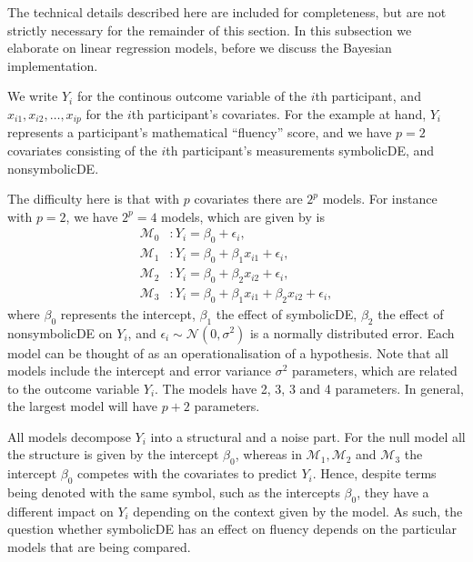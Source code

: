 \documentclass[english,,doc,floatsintext]{apa6}
\begin{document}
The technical details described here are included for completeness, but are not strictly necessary for the remainder of this section. In this subsection we elaborate on linear regression models, before we discuss the Bayesian implementation.

We write \(Y_{i}\) for the continous outcome variable of the \(i\)th participant, and \(x_{i1}, x_{i2}, \ldots, x_{ip}\) for the \(i\)th participant's covariates. For the example at hand, \(Y_{i}\) represents a participant's mathematical \enquote{fluency} score, and we have \(p=2\) covariates consisting of the \(i\)th participant's measurements symbolicDE, and nonsymbolicDE.

The difficulty here is that with \(p\) covariates there are \(2^{p}\) models. For instance with \(p=2\), we have \(2^{p} = 4\) models, which are given by is
\begin{align}
\mathcal{M}_{0} & : Y_{i} =\beta_{0} + \epsilon_{i}, \\
\mathcal{M}_{1} & : Y_{i} =\beta_{0} + \beta_{1} x_{i1} + \epsilon_{i}, \\
\mathcal{M}_{2} & : Y_{i} =\beta_{0} + \beta_{2} x_{i2} + \epsilon_{i}, \\
\mathcal{M}_{3} & : Y_{i} =\beta_{0} + \beta_{1} x_{i1} + \beta_{2} x_{i2} + \epsilon_{i},
\end{align}
where \(\beta_{0}\) represents the intercept, \(\beta_{1}\) the effect of symbolicDE, \(\beta_{2}\) the effect of nonsymbolicDE on \(Y_{i}\), and \(\epsilon_{i} \sim \mathcal{N}(0, \sigma^{2})\) is a normally distributed error. Each model can be thought of as an operationalisation of a hypothesis. Note that all models include the intercept and error variance \(\sigma^{2}\) parameters, which are related to the outcome variable \(Y_{i}\). The models have 2, 3, 3 and 4 parameters. In general, the largest model will have \(p + 2\) parameters.

All models decompose \(Y_{i}\) into a structural and a noise part. For the null model all the structure is given by the intercept \(\beta_{0}\), whereas in \(\mathcal{M}_{1}, \mathcal{M}_{2}\) and \(\mathcal{M}_{3}\) the intercept \(\beta_{0}\) competes with the covariates to predict \(Y_{i}\). Hence, despite terms being denoted with the same symbol, such as the intercepts \(\beta_{0}\), they have a different impact on \(Y_{i}\) depending on the context given by the model. As such, the question whether symbolicDE has an effect on fluency depends on the particular models that are being compared.
\end{document}

